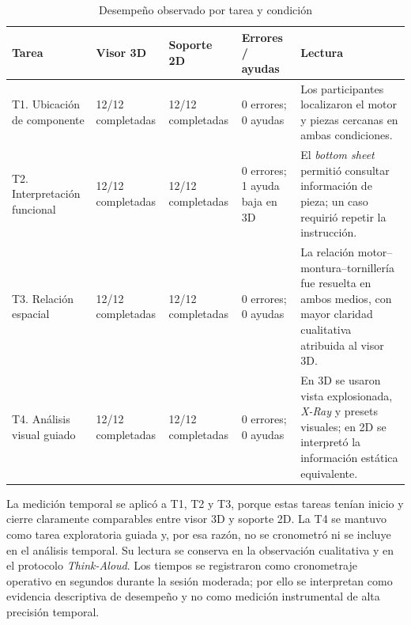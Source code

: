 \begin{table}[H]
    \caption{Desempeño observado por tarea y condición}
    \label{tab:desempeno_tareas_condicion}
    \centering
    \scriptsize
    \singlespacing
    \renewcommand{\arraystretch}{1.08}
    \setlength{\tabcolsep}{3pt}
    \begin{tabular}{p{3.1cm}p{2.2cm}p{2.2cm}p{2.4cm}p{4.3cm}}
        \hline
        \textbf{Tarea} & \textbf{Visor 3D} & \textbf{Soporte 2D} & \textbf{Errores / ayudas} & \textbf{Lectura} \\ \hline
        T1. Ubicación de componente & 12/12 completadas & 12/12 completadas & 0 errores; 0 ayudas & Los participantes localizaron el motor y piezas cercanas en ambas condiciones. \\
        T2. Interpretación funcional & 12/12 completadas & 12/12 completadas & 0 errores; 1 ayuda baja en 3D & El \textit{bottom sheet} permitió consultar información de pieza; un caso requirió repetir la instrucción. \\
        T3. Relación espacial & 12/12 completadas & 12/12 completadas & 0 errores; 0 ayudas & La relación motor--montura--tornillería fue resuelta en ambos medios, con mayor claridad cualitativa atribuida al visor 3D. \\
        T4. Análisis visual guiado & 12/12 completadas & 12/12 completadas & 0 errores; 0 ayudas & En 3D se usaron vista explosionada, \textit{X-Ray} y presets visuales; en 2D se interpretó la información estática equivalente. \\ \hline
    \end{tabular}
    \par\vspace{0.5\baselineskip}
\end{table}

La medición temporal se aplicó a T1, T2 y T3, porque estas tareas tenían inicio y cierre claramente comparables entre visor 3D y soporte 2D. La T4 se mantuvo como tarea exploratoria guiada y, por esa razón, no se cronometró ni se incluye en el análisis temporal. Su lectura se conserva en la observación cualitativa y en el protocolo \textit{Think-Aloud}. Los tiempos se registraron como cronometraje operativo en segundos durante la sesión moderada; por ello se interpretan como evidencia descriptiva de desempeño y no como medición instrumental de alta precisión temporal.

